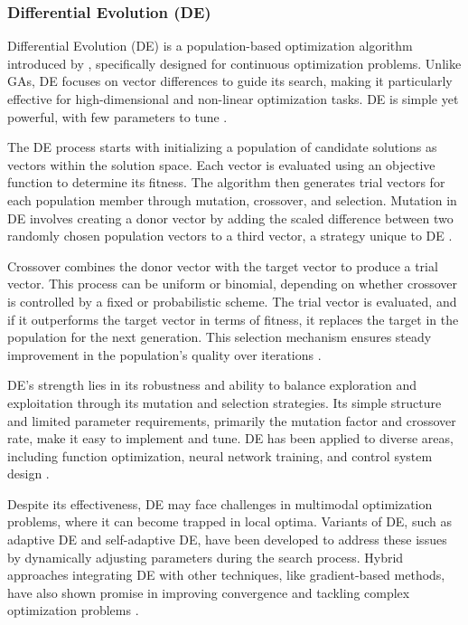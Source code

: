 \subsubsection*{Differential Evolution (DE)}

Differential Evolution (DE) is a population-based optimization algorithm introduced by \textcite{storn1997differential}, specifically designed for continuous optimization problems. Unlike GAs, DE focuses on vector differences to guide its search, making it particularly effective for high-dimensional and non-linear optimization tasks. DE is simple yet powerful, with few parameters to tune \parencite{price2006differential}.

The DE process starts with initializing a population of candidate solutions as vectors within the solution space. Each vector is evaluated using an objective function to determine its fitness. The algorithm then generates trial vectors for each population member through mutation, crossover, and selection. Mutation in DE involves creating a donor vector by adding the scaled difference between two randomly chosen population vectors to a third vector, a strategy unique to DE \parencite{mezura2006comparative}.

Crossover combines the donor vector with the target vector to produce a trial vector. This process can be uniform or binomial, depending on whether crossover is controlled by a fixed or probabilistic scheme. The trial vector is evaluated, and if it outperforms the target vector in terms of fitness, it replaces the target in the population for the next generation. This selection mechanism ensures steady improvement in the population's quality over iterations \parencite{das2010differential}.

DE's strength lies in its robustness and ability to balance exploration and exploitation through its mutation and selection strategies. Its simple structure and limited parameter requirements, primarily the mutation factor and crossover rate, make it easy to implement and tune. DE has been applied to diverse areas, including function optimization, neural network training, and control system design \parencite{miettinen1999nonlinear}.

Despite its effectiveness, DE may face challenges in multimodal optimization problems, where it can become trapped in local optima. Variants of DE, such as adaptive DE and self-adaptive DE, have been developed to address these issues by dynamically adjusting parameters during the search process. Hybrid approaches integrating DE with other techniques, like gradient-based methods, have also shown promise in improving convergence and tackling complex optimization problems \parencite{qin2008differential}.



